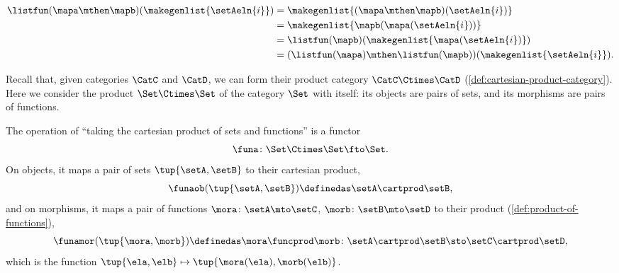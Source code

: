 \begin{example}
    \begin{equation}\label{eq:list-functor-compositionality}
        \begin{aligned}
            \listfun(\mapa \mthen \mapb)(\makegenlist{\setAeln{i}}) & =\makegenlist{ (\mapa \mthen \mapb)(\setAeln{i})} \\
                                                                    & =\makegenlist{  \mapb ( \mapa (\setAeln{i}))} \\
                                                                    & =\listfun(\mapb)(\makegenlist{\mapa(\setAeln{i})}) \\
                                                                    & =(\listfun(\mapa)\mthen \listfun(\mapb))(\makegenlist{\setAeln{i}}).
        \end{aligned}
    \end{equation}
\end{example}

\begin{example}
    \label{exa:cart-prod-functor}
    Recall that, given categories $\CatC$ and $\CatD$, we can form their product category $\CatC \Ctimes \CatD$ (\cref{def:cartesian-product-category}).
    Here we consider the product $\Set \Ctimes \Set$ of the category $\Set$ with itself: its objects are pairs of sets, and its morphisms are pairs of functions.

    The operation of ``taking the cartesian product of sets and functions'' is a functor
    \begin{equation}
        \funa \colon \Set \Ctimes \Set \fto \Set.
    \end{equation}
    On objects, it maps a pair of sets $\tup{\setA, \setB}$ to their cartesian product,
    \begin{equation}
        \funaob(\tup{\setA, \setB}) \definedas \setA \cartprod \setB,
    \end{equation}
    and on morphisms, it maps a pair of functions $\mora \colon \setA \mto \setC$, $\morb \colon \setB \mto \setD$ to their product (\cref{def:product-of-functions}),
    \begin{equation}
        \funamor(\tup{\mora, \morb}) \definedas \mora \funcprod \morb \colon \setA \cartprod \setB \sto \setC \cartprod \setD,
    \end{equation}
    which is the function $\tup{\ela, \elb} \mapsto \tup{\mora(\ela), \morb(\elb)}$.
\end{example}

